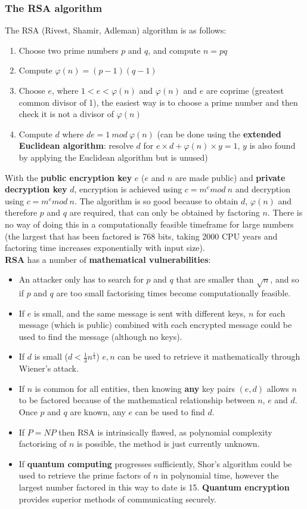 \documentclass[final]{article}
\newcommand{\np}{\vspace{8pt} \\}
\begin{document}
\subsubsection{The RSA algorithm}
The RSA (Rivest, Shamir, Adleman) algorithm is as follows:
\begin{enumerate}
	\item Choose two prime numbers $ p $ and $ q $, and compute $ n = pq $
	\item Compute $ \varphi(n) = (p-1)(q-1) $
	\item Choose $ e $, where $ 1 < e < \varphi(n) $ and $ \varphi(n) $ and $ e $ are coprime (greatest common divisor of 1), the easiest way is to choose a prime number and then check it is not a divisor of $ \varphi(n) $
	\item Compute $ d $ where $ de = 1\ mod\ \varphi(n) $ (can be done using the \textbf{extended Euclidean algorithm}: resolve $ d $ for $ e \times d + \varphi(n) \times y = 1 $, $ y $ is also found by applying the Euclidean algorithm but is unused)
\end{enumerate}
With the \textbf{public encryption key} $ e $ ($ e $ and $ n $ are made public) and \textbf{private decryption key} $ d $, encryption is achieved using $ c = m^{e} mod\ n $ and decryption using $ c = m^{e} mod\ n $. The algorithm is so good because to obtain $ d $, $ \varphi(n) $ and therefore $ p $ and $ q $ are required, that can only be obtained by factoring $ n $. There is no way of doing this in a computationally feasible timeframe for large numbers (the largest that has been factored is 768 bits, taking 2000 CPU years and factoring time increases exponentially with input size). \np
\textbf{RSA} has a number of \textbf{mathematical vulnerabilities}:
\begin{itemize}
	\item An attacker only has to search for $ p $ and $ q $ that are smaller than $ \sqrt{n} $, and so if $ p $ and $ q $ are too small factorising times become computationally feasible.
	\item If $ e $ is small, and the same message is sent with different keys, $ n $ for each message (which is public) combined with each encrypted message could be used to find the message (although no keys).
	\item If $ d $ is small ($ d < \frac{1}{3} n^{\frac{1}{4}} $) $ e, n $ can be used to retrieve it mathematically through Wiener's attack.
	\item If $ n $ is common for all entities, then knowing \textbf{any} key pairs $ (e, d) $ allows $ n $ to be factored because of the mathematical relationship between $ n $, $ e $ and $ d $. Once $ p $ and $ q $ are known, any $ e $ can be used to find $ d $.
	\item If $ P = NP $ then RSA is intrinsically flawed, as polynomial complexity factorising of $ n $ is possible, the method is just currently unknown.
	\item If \textbf{quantum computing} progresses sufficiently, Shor's algorithm could be used to retrieve the prime factors of $ n $ in polynomial time, however the largest number factored in this way to date is 15. \textbf{Quantum encryption} provides superior methods of communicating securely.
\end{itemize}
\end{document}
